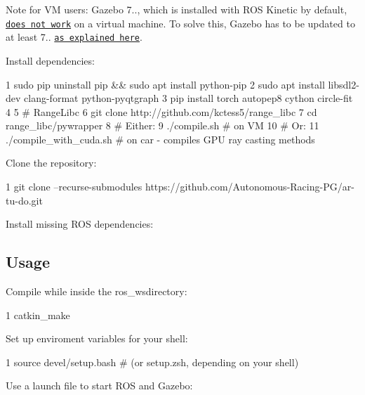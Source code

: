 Note for VM users\+: Gazebo 7.., which is installed with R\+OS Kinetic by default, \href{https://bitbucket.org/osrf/gazebo/issues/1837/vmware-rendering-z-ordering-appears-random}{\tt does not work} on a virtual machine. To solve this, Gazebo has to be updated to at least 7.. \href{http://gazebosim.org/tutorials?cat=install&tut=install_ubuntu&ver=7.0#Alternativeinstallation:step-by-step}{\tt as explained here}.

Install dependencies\+:


\begin{DoxyCode}
1 sudo pip uninstall pip && sudo apt install python-pip
2 sudo apt install libsdl2-dev clang-format python-pyqtgraph
3 pip install torch autopep8 cython circle-fit
4 
5 # RangeLibc
6 git clone http://github.com/kctess5/range\_libc
7 cd range\_libc/pywrapper
8 # Either:
9 ./compile.sh            # on VM
10 # Or:
11 ./compile\_with\_cuda.sh  # on car - compiles GPU ray casting methods
\end{DoxyCode}


Clone the repository\+:


\begin{DoxyCode}
1 git clone --recurse-submodules https://github.com/Autonomous-Racing-PG/ar-tu-do.git
\end{DoxyCode}


Install missing R\+OS dependencies\+:




\subsection*{Usage}

Compile while inside the {\ttfamily ros\+\_\+ws}directory\+:


\begin{DoxyCode}
1 catkin\_make
\end{DoxyCode}


Set up enviroment variables for your shell\+:


\begin{DoxyCode}
1 source devel/setup.bash # (or setup.zsh, depending on your shell)
\end{DoxyCode}


Use a launch file to start R\+OS and Gazebo\+:


